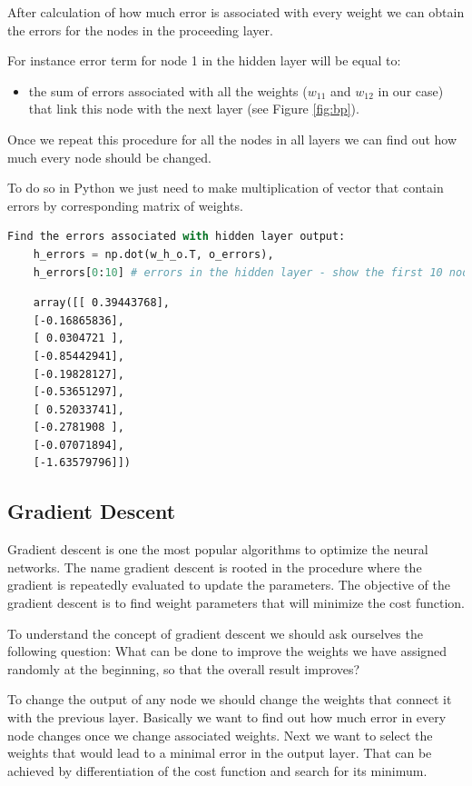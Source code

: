 After calculation of how much error is associated with every weight we can obtain the errors for the nodes in the proceeding layer.
 
For instance error term for node 1 in the hidden layer will be equal to:
\begin{itemize}
   \item the sum of errors associated with all the weights (\(w_{11}\) and \(w_{12}\) in our case) that link this node with the next layer (see Figure \ref{fig:bp}).
\end{itemize}


Once we repeat this procedure for all the nodes in all layers we can find out how much every node should be changed.

To do so in Python we just need to make multiplication of vector that contain errors by corresponding matrix of weights.

\begin{lstlisting}[language=Python]
    Find the errors associated with hidden layer output:
    h_errors = np.dot(w_h_o.T, o_errors),
    h_errors[0:10] # errors in the hidden layer - show the first 10 nodes out of 90.
\end{lstlisting}

\begin{lstlisting}
    array([[ 0.39443768],
    [-0.16865836],
    [ 0.0304721 ],
    [-0.85442941],
    [-0.19828127],
    [-0.53651297],
    [ 0.52033741],
    [-0.2781908 ],
    [-0.07071894],
    [-1.63579796]])
\end{lstlisting}

\subsection{Gradient Descent}

Gradient descent is one the most popular algorithms to optimize the neural networks. The name gradient descent is rooted in the procedure where the gradient is repeatedly evaluated to update the parameters. The objective of the gradient descent is to find weight parameters that will minimize the cost function.

To understand the concept of gradient descent we should ask ourselves the following question: What can be done to improve the weights we have assigned randomly at the beginning, so that the overall result improves?

To change the output of any node we should change the weights that connect it with the previous layer. Basically we want to find out how much error in every node changes once we change associated weights. Next we want to select the weights that would lead to a minimal error in the output layer. That can be achieved by differentiation of the cost function and search for its minimum.

